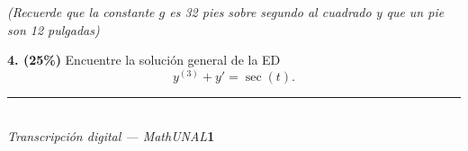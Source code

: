 \documentclass[11pt]{article}
\begin{document}
\textit{(Recuerde que la constante $g$ es 32 pies sobre segundo al cuadrado y que un pie son 12 pulgadas)}

\vspace{9cm}

\newpage

\noindent\textbf{4. (25\%)} Encuentre la solución general de la ED
\[
y^{(3)}+y'=\sec(t).
\]

\vspace{9cm}

\vfill
\rule{\linewidth}{0.4pt}\\[1pt]
{\scriptsize\textit{Transcripción digital --- MathUNAL}\hfill\textcolor{unalblue}{\textbf{1}}}
\end{document}
